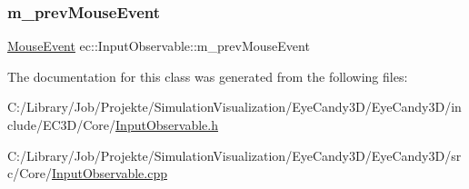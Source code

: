 \subsubsection{\texorpdfstring{m\+\_\+prev\+Mouse\+Event}{m\_prevMouseEvent}}
{\footnotesize\ttfamily \mbox{\hyperlink{structec_1_1_mouse_event}{Mouse\+Event}} ec\+::\+Input\+Observable\+::m\+\_\+prev\+Mouse\+Event\hspace{0.3cm}{\ttfamily [protected]}}



The documentation for this class was generated from the following files\+:\begin{DoxyCompactItemize}
\item 
C\+:/\+Library/\+Job/\+Projekte/\+Simulation\+Visualization/\+Eye\+Candy3\+D/\+Eye\+Candy3\+D/include/\+E\+C3\+D/\+Core/\mbox{\hyperlink{_input_observable_8h}{Input\+Observable.\+h}}\item 
C\+:/\+Library/\+Job/\+Projekte/\+Simulation\+Visualization/\+Eye\+Candy3\+D/\+Eye\+Candy3\+D/src/\+Core/\mbox{\hyperlink{_input_observable_8cpp}{Input\+Observable.\+cpp}}\end{DoxyCompactItemize}
